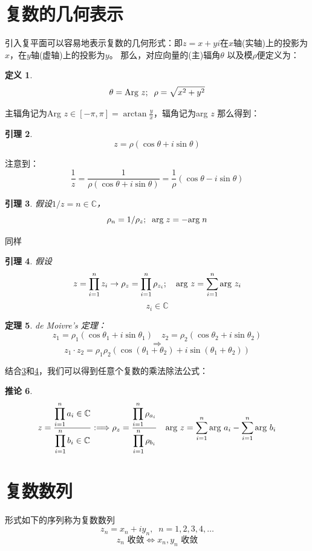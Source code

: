\documentclass[10pt, a4paper, oneside]{ctexbook}
\newtheorem{theorem}{定理}[section]
\newtheorem{definition}[theorem]{定义}
\newtheorem{lemma}[theorem]{引理}
\newtheorem{corollary}[theorem]{推论}
\begin{document}
\section{复数的几何表示}
引入复平面可以容易地表示复数的几何形式：即$z=x+yi$在$x$轴(实轴)上的投影为$x$，在$y$轴(虚轴)上的投影为$y$。
那么，对应向量的(主)辐角$\theta$ 以及模$\rho$便定义为：
\begin{definition}
    $$\theta=\text{\rm Arg } z;\;\;\rho=\sqrt{x^2+y^2}$$
\end{definition}
主辐角记为Arg $\displaystyle z \in[-\pi,\pi] =\arctan \frac{y}{x}$，辐角记为arg $z$
那么得到：
\begin{lemma}
    \label{eularq}
    $$
    z = \rho(\cos \theta + i \sin \theta)
    $$
\end{lemma}
注意到：
$$
\frac{1}{z}=\frac{1}{\rho(\cos \theta + i \sin \theta)}=\frac{1}{\rho}(\cos \theta - i \sin \theta)
$$
\begin{lemma}
    \label{le1}
    假设$1/z=n\in \mathbb{C}$，
    $$\rho_{n}=1/\rho_z;\;\; {\rm arg \;} z=-{\rm arg \;} n$$
\end{lemma}
同样
\begin{lemma}
    \label{le2}
    假设$$
    z=\prod_{i=1}^{n}z_i\to \rho_z=\prod_{i=1}^n \rho_{z_i};\quad \text{\rm arg }z=\sum_{i=1}^n \text{\rm arg }z_i
    $$
    $$z_i\in\mathbb{C}$$
\end{lemma}
\begin{theorem}
    de Moivre’s 定理：
    $$z_1=\rho_1(\cos\theta_1+i\sin \theta_1)\quad z_2=\rho_2(\cos\theta_2+i\sin \theta_2)$$
    $$\Rightarrow$$
    $$z_1\cdot z_2=\rho_1\rho_2(\cos(\theta_1+\theta_2)+i\sin(\theta_1+\theta_2))$$
\end{theorem}
结合\ref{le1}和\ref{le2}，我们可以得到任意个复数的乘法除法公式：
\begin{corollary}
    \begin{align*}
        z=\frac{\displaystyle\prod_{i=1}^n a_i \in \mathbb{C} }{\displaystyle\prod_{i=1}^n b_i \in \mathbb{C}}
        :\Longrightarrow \rho_z=\frac{\displaystyle\prod_{i=1}^n \rho_{a_i}}{\displaystyle\prod_{i=1}^n \rho_{b_i}} \quad \text{\rm arg }z = 
        \sum_{i=1}^n \text{\rm arg }a_i - \sum_{i=1}^n \text{\rm arg }b_i
    \end{align*}
\end{corollary}
\section{复数数列}
形式如下的序列称为复数数列
$$
z_n=x_n+i y_n , \; \; n=1,2,3,4,\dots
$$
$$z_n\text{ 收敛} \Leftrightarrow x_{n},y_{n} \text{ 收敛} $$
\end{document}
